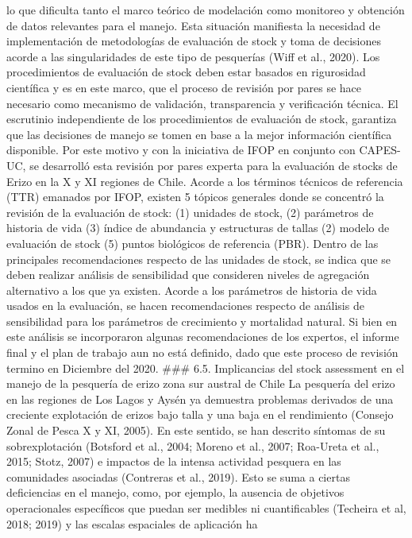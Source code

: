 \documentclass[
]{article}
\begin{document}
lo que dificulta tanto el marco teórico de modelación como monitoreo y
obtención de datos relevantes para el manejo. Esta situación manifiesta
la necesidad de implementación de metodologías de evaluación de stock y
toma de decisiones acorde a las singularidades de este tipo de
pesquerías (Wiff et al., 2020). Los procedimientos de evaluación de
stock deben estar basados en rigurosidad científica y es en este marco,
que el proceso de revisión por pares se hace necesario como mecanismo de
validación, transparencia y verificación técnica. El escrutinio
independiente de los procedimientos de evaluación de stock, garantiza
que las decisiones de manejo se tomen en base a la mejor información
científica disponible. Por este motivo y con la iniciativa de IFOP en
conjunto con CAPES-UC, se desarrolló esta revisión por pares experta
para la evaluación de stocks de Erizo en la X y XI regiones de Chile.
Acorde a los términos técnicos de referencia (TTR) emanados por IFOP,
existen 5 tópicos generales donde se concentró la revisión de la
evaluación de stock: (1) unidades de stock, (2) parámetros de historia
de vida (3) índice de abundancia y estructuras de tallas (2) modelo de
evaluación de stock (5) puntos biológicos de referencia (PBR). Dentro de
las principales recomendaciones respecto de las unidades de stock, se
indica que se deben realizar análisis de sensibilidad que consideren
niveles de agregación alternativo a los que ya existen. Acorde a los
parámetros de historia de vida usados en la evaluación, se hacen
recomendaciones respecto de análisis de sensibilidad para los parámetros
de crecimiento y mortalidad natural. Si bien en este análisis se
incorporaron algunas recomendaciones de los expertos, el informe final y
el plan de trabajo aun no está definido, dado que este proceso de
revisión termino en Diciembre del 2020. \#\#\# 6.5. Implicancias del
stock assessment en el manejo de la pesquería de erizo zona sur austral
de Chile La pesquería del erizo en las regiones de Los Lagos y Aysén ya
demuestra problemas derivados de una creciente explotación de erizos
bajo talla y una baja en el rendimiento (Consejo Zonal de Pesca X y XI,
2005). En este sentido, se han descrito síntomas de su sobrexplotación
(Botsford et al., 2004; Moreno et al., 2007; Roa-Ureta et al., 2015;
Stotz, 2007) e impactos de la intensa actividad pesquera en las
comunidades asociadas (Contreras et al., 2019). Esto se suma a ciertas
deficiencias en el manejo, como, por ejemplo, la ausencia de objetivos
operacionales específicos que puedan ser medibles ni cuantificables
(Techeira et al, 2018; 2019) y las escalas espaciales de aplicación ha
\end{document}

